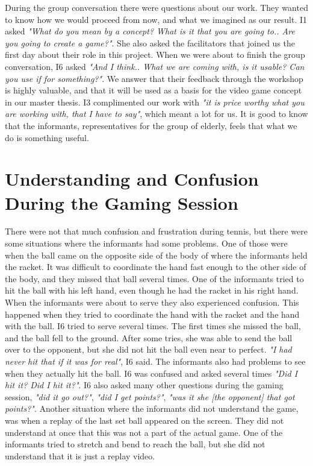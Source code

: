 During the group conversation there were questions about our work. They wanted to know how we would proceed from now, and what we imagined as our result. I1 asked \emph{"What do you mean by a concept? What is it that you are going to.. Are you going to create a game?"}. She also asked the facilitators that joined us the first day about their role in this project. When we were about to finish the group conversation, I6 asked \emph{"And I think.. What we are coming with, is it usable? Can you use if for something?"}. We answer that their feedback through the workshop is highly valuable, and that it will be used as a basis for the video game concept in our master thesis. I3 complimented our work with \emph{"it is price worthy what you are working with, that I have to say"}, which meant a lot for us. It is good to know that the informants, representatives for the group of elderly, feels that what we do is something useful.  

\section{Understanding and Confusion During the Gaming Session}


There were not that much confusion and frustration during tennis, but there were some situations where the informants had some problems. One of those were when the ball came on the opposite side of the body of where the informants held the racket. It was difficult to coordinate the hand fast enough to the other side of the body, and they missed that ball several times. One of the informants tried to hit the ball with his left hand, even though he had the racket in his right hand. When the informants were about to serve they also experienced confusion. This happened when they tried to coordinate the hand with the racket and the hand with the ball. I6 tried to serve several times. The first times she missed the ball, and the ball fell to the ground. After some tries, she was able to send the ball over to the opponent, but she did not hit the ball even near to perfect. \emph{"I had never hit that if it was for real"}, I6 said. The informants also had problems to see when they actually hit the ball. I6 was confused and asked several times \emph{"Did I hit it? Did I hit it?"}. I6 also asked many other questions during the gaming session, \emph{"did it go out?"}, \emph{"did I get points?"}, \emph{"was it she [the opponent] that got points?"}. Another situation where the informants did not understand the game, was when a replay of the last set ball appeared on the screen. They did not understand at once that this was not a part of the actual game. One of the informants tried to stretch and bend to reach the ball, but she did not understand that it is just a replay video.


